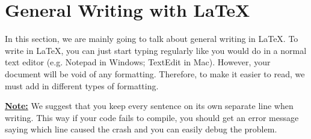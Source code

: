 \documentclass[]{article}%
\theoremstyle{definition}
\begin{document}

\section{General Writing with \LaTeX}
In this section, we are mainly going to talk about general writing in \LaTeX.
To write in \LaTeX, you can just start typing regularly like you would do in a normal text editor (e.g. Notepad in Windows; TextEdit in Mac).
However, your document will be void of any formatting.
Therefore, to make it easier to read, we must add in different types of formatting. \vspace{0.25cm}

\noindent \textbf{\underline{Note:}} We suggest that you keep every sentence on its own separate line when writing.
This way if your code fails to compile, you should get an error message saying which line caused the crash and you can easily debug the problem.
\end{document}
